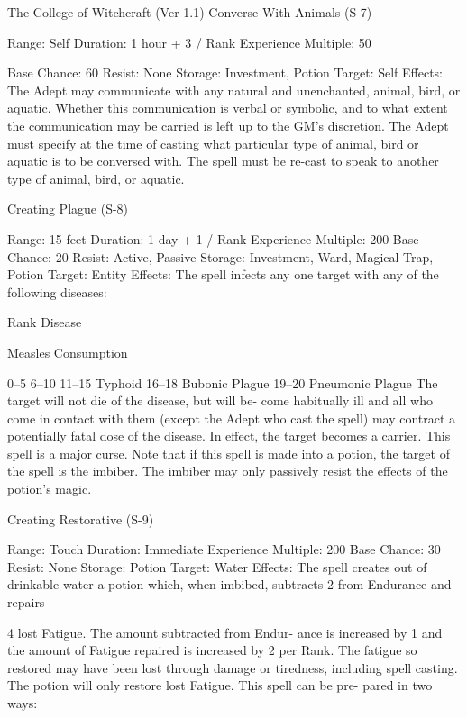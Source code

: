 \begin{Chapter}{The College of Witchcraft (Ver 1.1)}
Converse With Animals (S-7) 

Range: Self 
Duration: 1 hour + 3 / Rank 
Experience Multiple: 50 

Base Chance: 60%
Resist: None 
Storage: Investment, Potion 
Target: Self 
Effects:  The  Adept  may  communicate  with  any 
natural  and  unenchanted,  animal,  bird,  or  aquatic. 
Whether this communication is verbal or symbolic, 
and  to  what  extent  the  communication  may  be 
carried is left up to the GM’s discretion. The Adept 
must specify at the time of casting what particular 
type  of  animal,  bird  or  aquatic  is  to  be  conversed 
with. The spell must be re-cast to speak to another 
type of animal, bird, or aquatic. 

Creating Plague (S-8) 

Range: 15 feet 
Duration: 1 day + 1 / Rank 
Experience Multiple: 200 
Base Chance: 20%
Resist: Active, Passive 
Storage: Investment, Ward, Magical Trap, Potion 
Target: Entity 
Effects: The spell infects any one target with any of 
the following diseases: 

Rank  Disease 

Measles 
Consumption 

0–5 
6–10 
11–15  Typhoid 
16–18  Bubonic Plague 
19–20  Pneumonic Plague 
The  target  will  not  die  of  the  disease,  but  will  be-
come  habitually  ill  and  all  who  come  in  contact 
with  them  (except  the  Adept  who  cast  the  spell) 
may contract a potentially fatal dose of the disease. 
In effect, the target becomes a carrier. This spell is 
a major curse. Note that if this spell is made into a 
potion,  the  target  of  the  spell  is  the  imbiber.  The 
imbiber may only passively resist the effects of the 
potion’s magic. 

Creating Restorative (S-9) 

Range: Touch 
Duration: Immediate 
Experience Multiple: 200 
Base Chance: 30%
Resist: None 
Storage: Potion 
Target: Water 
Effects:  The  spell  creates  out  of  drinkable  water  a 
potion  which,  when  imbibed,  subtracts  2  from 
Endurance and repairs 

4 lost Fatigue. The amount subtracted from Endur-
ance  is  increased  by  1  and  the  amount  of  Fatigue 
repaired is increased by 2 per Rank. The fatigue so 
restored  may  have  been  lost  through  damage  or 
tiredness,  including  spell  casting.  The  potion  will 
only  restore  lost  Fatigue.  This  spell  can  be  pre-
pared in two ways: 


\end{Chapter}
